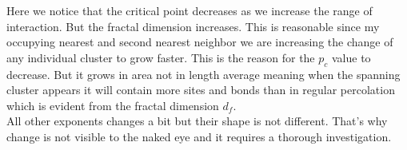 Here we notice that the critical point decreases as we increase the range of interaction. But the fractal dimension increases. This is reasonable since my occupying nearest and second nearest neighbor we are increasing the change of any individual cluster to grow faster. This is the reason for the $p_c$ value to decrease. But it grows in area not in length average meaning when the spanning cluster appears it will contain more sites and bonds than in regular percolation which is evident from the fractal dimension $d_f$. \\
All other exponents changes a bit but their shape is not different. That's why change is not visible to the naked eye and it requires a thorough investigation.